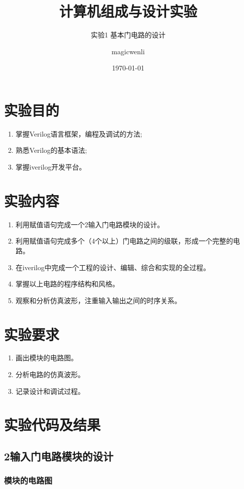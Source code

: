 \documentclass[14pt, b5paper, sourcefont]{qyxf-report-large}
\author{magicwenli}
\date{\today}
\title{计算机组成与设计实验}
\subtitle{实验1 基本门电路的设计}
\begin{document}
\maketitle
\tableofcontents


\section{实验目的}
\begin{enumerate}
	\item 掌握Verilog语言框架，编程及调试的方法;
	\item 熟悉Verilog的基本语法;
	\item 掌握iverilog开发平台。
\end{enumerate}

\section{实验内容}
\begin{enumerate}
	\item 利用赋值语句完成一个2输入门电路模块的设计。
	\item 利用赋值语句完成多个（4个以上）门电路之间的级联，形成一个完整的电路。
	\item 在iverilog中完成一个工程的设计、编辑、综合和实现的全过程。
	\item 掌握以上电路的程序结构和风格。
	\item 观察和分析仿真波形，注重输入输出之间的时序关系。
\end{enumerate}

\section{实验要求}
\begin{enumerate}
	\item 画出模块的电路图。
	\item 分析电路的仿真波形。
	\item 记录设计和调试过程。
\end{enumerate}

\section{实验代码及结果}

\subsection{2输入门电路模块的设计}
\subsubsection{模块的电路图}
\end{document}
